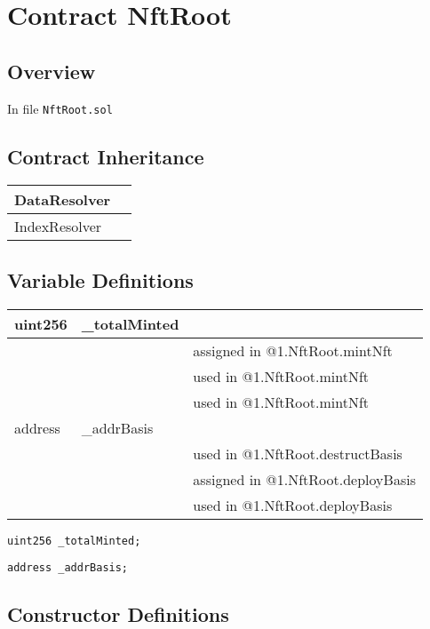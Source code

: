 
\chapter{Contract NftRoot}

\minitoc

\section{Overview}


In file {\tt NftRoot.sol}

\section{Contract Inheritance}


\noindent\begin{tabular}{|l|p{5cm}|}\hline
DataResolver & \\\hline
IndexResolver & \\\hline
\end{tabular}


\section{Variable Definitions}


\ifsoltables
\noindent\begin{tabular}{|l|l|p{5cm}|}\hline
uint256 & \_{}totalMinted &  \\\hline
 & & assigned in @1.NftRoot.mintNft\\\hline
 & & used in @1.NftRoot.mintNft\\\hline
 & & used in @1.NftRoot.mintNft\\\hline
address & \_{}addrBasis &  \\\hline
 & & used in @1.NftRoot.destructBasis\\\hline
 & & assigned in @1.NftRoot.deployBasis\\\hline
 & & used in @1.NftRoot.deployBasis\\\hline
\end{tabular}
\fi


\begin{lstlisting}[firstnumber=16]
    uint256 _totalMinted;
\end{lstlisting}

\begin{lstlisting}[firstnumber=17]
    address _addrBasis;
\end{lstlisting}

\section{Constructor Definitions}


